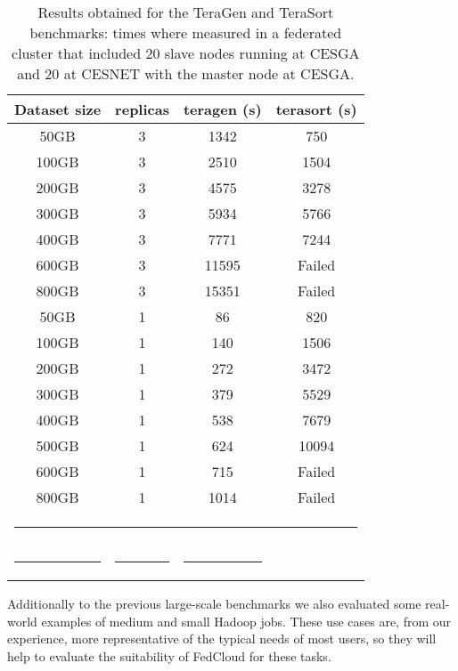 \begin{table}[h!]
\caption{Results obtained for the TeraGen and TeraSort benchmarks: times where measured in a federated cluster that included 20 slave nodes running at CESGA and 20 at CESNET with the master node at CESGA.  }
\label{table:terasort}
%
\vspace{-0.5em}
%
\begin{center}
\begin{tabular}{cccc}
\toprule
Dataset size		& replicas & teragen (s)		& terasort (s) 	  \\
\midrule
50GB  & 3 & 1342 & 750 \\
100GB & 3 & 2510 & 1504 \\
200GB & 3 & 4575 & 3278 \\
300GB & 3 & 5934 & 5766 \\
400GB & 3 & 7771 & 7244 \\
600GB & 3 & 11595 & Failed \\
800GB & 3 & 15351 & Failed \\
50GB & 1 & 86 & 820 \\
100GB & 1 & 140 & 1506 \\
200GB & 1 & 272 & 3472 \\
300GB & 1 & 379 & 5529 \\
400GB & 1 & 538 & 7679 \\
500GB & 1 & 624 & 10094 \\
600GB & 1 & 715 & Failed \\
800GB & 1 & 1014 & Failed \\
%
\bottomrule
\multicolumn{4}{c}{\rule{0.98\textwidth}{0em}}\\
\rule{0.2\textwidth}{0cm} & \rule{0.2\textwidth}{0cm} & \rule{0.2\textwidth}{0cm} &   \\
\end{tabular}
\end{center}
\end{table}


Additionally to the previous large-scale benchmarks we also evaluated some real-world examples of medium and small Hadoop jobs. These use cases are, from our experience, more representative of the typical needs of most users, so they will help to evaluate the suitability of FedCloud for these tasks.


